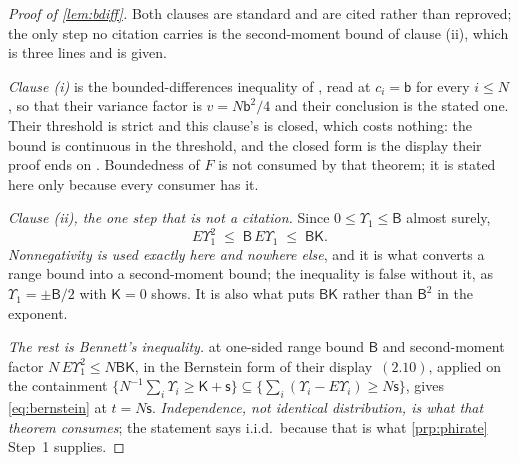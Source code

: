 \begin{proof}[Proof of \cref{lem:bdiff}]
Both clauses are standard and are cited rather than reproved; the only step no citation carries
is the second-moment bound of clause \textup{(ii)}, which is three lines and is given.

\emph{Clause \textup{(i)}} is the bounded-differences inequality of \citet[Thm.~6.2]{blm2013}, read at
$c_i=\mathsf b$ for every $i\le N$, so that their variance factor is $v=N\mathsf b^{2}/4$ and their
conclusion is the stated one. Their threshold is strict and this clause's is closed, which costs
nothing: the bound is continuous in the threshold, and the closed form is the display their proof ends
on \citep[p.~172]{blm2013}. Boundedness of $F$ is not consumed by that theorem; it is stated here only
because every consumer has it.

\emph{Clause \textup{(ii)}, the one step that is not a citation.} Since
$0\le\varUpsilon_1\le\mathsf B$ almost surely,
\[
E\varUpsilon_1^{2}\;\le\;\mathsf B\,E\varUpsilon_1\;\le\;\mathsf B\mathsf K .
\]
\emph{Nonnegativity is used exactly here and nowhere else}, and it is what converts a range bound into
a second-moment bound; the inequality is false without it, as $\varUpsilon_1=\pm\mathsf B/2$ with
$\mathsf K=0$ shows. It is also what puts $\mathsf B\mathsf K$ rather than $\mathsf B^{2}$ in the
exponent.

\emph{The rest is Bennett's inequality.} \citet[Thm.~2.9]{blm2013} at one-sided range bound
$\mathsf B$ and second-moment factor $N\,E\varUpsilon_1^{2}\le N\mathsf B\mathsf K$, in the Bernstein
form of their display~$(2.10)$, applied on the containment
$\{N^{-1}\sum_i\varUpsilon_i\ge\mathsf K+\mathsf s\}\subseteq
\{\sum_i(\varUpsilon_i-E\varUpsilon_i)\ge N\mathsf s\}$, gives \eqref{eq:bernstein} at $t=N\mathsf s$.
\emph{Independence, not identical distribution, is what that theorem consumes}; the statement says
i.i.d.\ because that is what \cref{prp:phirate} Step~1 supplies.
\end{proof}

